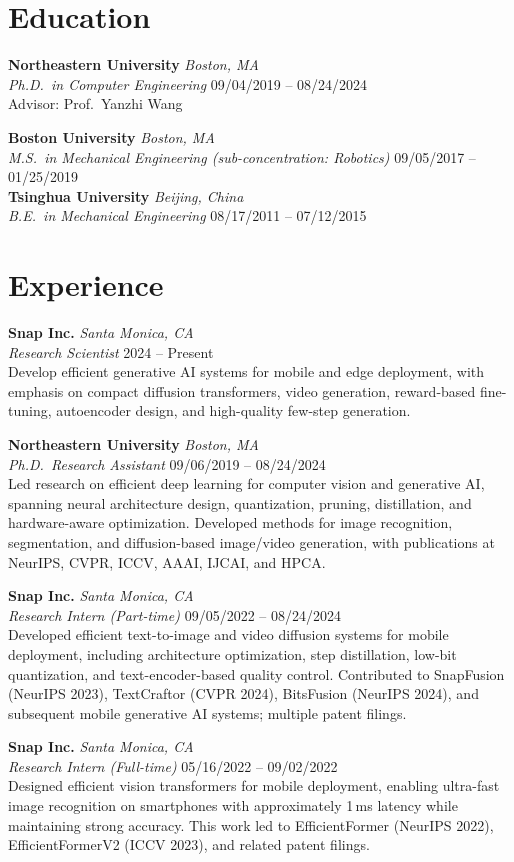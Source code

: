\documentclass[11pt,letterpaper]{article}
\newcommand{\cventry}[4]{%
    \noindent\textbf{#1} \hfill \textit{#2} \\
    \textit{#3} \hfill #4 \\[4pt]
}
\begin{document}
\section{Education}

\cventry{Northeastern University}{Boston, MA}{Ph.D.\ in Computer Engineering}{09/04/2019 -- 08/24/2024}
Advisor: Prof.\ Yanzhi Wang

\cventry{Boston University}{Boston, MA}{M.S.\ in Mechanical Engineering (sub-concentration: Robotics)}{09/05/2017 -- 01/25/2019}

\cventry{Tsinghua University}{Beijing, China}{B.E.\ in Mechanical Engineering}{08/17/2011 -- 07/12/2015}

\section{Experience}

\cventry{Snap Inc.}{Santa Monica, CA}{Research Scientist}{2024 -- Present}
Develop efficient generative AI systems for mobile and edge deployment, with emphasis on compact diffusion transformers, video generation, reward-based fine-tuning, autoencoder design, and high-quality few-step generation.

\cventry{Northeastern University}{Boston, MA}{Ph.D.\ Research Assistant}{09/06/2019 -- 08/24/2024}
Led research on efficient deep learning for computer vision and generative AI, spanning neural architecture design, quantization, pruning, distillation, and hardware-aware optimization. Developed methods for image recognition, segmentation, and diffusion-based image/video generation, with publications at NeurIPS, CVPR, ICCV, AAAI, IJCAI, and HPCA.

\cventry{Snap Inc.}{Santa Monica, CA}{Research Intern (Part-time)}{09/05/2022 -- 08/24/2024}
Developed efficient text-to-image and video diffusion systems for mobile deployment, including architecture optimization, step distillation, low-bit quantization, and text-encoder-based quality control. Contributed to SnapFusion (NeurIPS 2023), TextCraftor (CVPR 2024), BitsFusion (NeurIPS 2024), and subsequent mobile generative AI systems; multiple patent filings.

\cventry{Snap Inc.}{Santa Monica, CA}{Research Intern (Full-time)}{05/16/2022 -- 09/02/2022}
Designed efficient vision transformers for mobile deployment, enabling ultra-fast image recognition on smartphones with approximately 1\,ms latency while maintaining strong accuracy. This work led to EfficientFormer (NeurIPS 2022), EfficientFormerV2 (ICCV 2023), and related patent filings.
\end{document}

